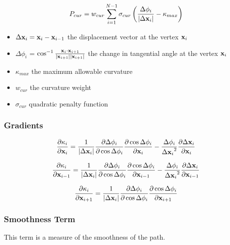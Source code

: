 \begin{equation}
P_{cur} = w_{cur} \displaystyle\sum_{i=1}^{N-1} \sigma_{cur}\left(\frac{\Delta\phi_i}{|\Delta\mathbf{x}_i|} - \kappa_{max}\right)
\end{equation}

\begin{itemize}
\item $\Delta\mathbf{x}_i = \mathbf{x}_i - \mathbf{x}_{i-1}$ the displacement vector at the vertex $\mathbf{x}_i$
\item $\Delta\phi_i$ = $\cos^{-1}\frac{\mathbf{x}_{i}\cdot\mathbf{x}_{i+1}}{|\mathbf{x}_{i+1}||\mathbf{x}_{i+1}| }$ the change in tangential angle at the vertex $\mathbf{x}_i$
\item $\kappa_{max}$ the maximum allowable curvature
\item $w_{cur}$ the curvature weight
\item $\sigma_{cur}$ quadratic penalty function
\end{itemize}

\subsubsection{Gradients}

\begin{equation}
\frac{\partial \kappa_i}{\partial \mathbf{x}_i} = \frac{1}{|\Delta\mathbf{x}_i|}\frac{\partial\Delta\phi_i}{\partial\cos\Delta\phi_i}\frac{\partial\cos\Delta\phi_i}{\partial\mathbf{x}_i}-\frac{\Delta\phi_i}{{\Delta\mathbf{x}_i}^2}\frac{\partial\Delta\mathbf{x}_i}{\partial\mathbf{x}_i}
\end{equation}

\begin{equation}
\frac{\partial \kappa_i}{\partial \mathbf{x}_{i-1}} = \frac{1}{|\Delta\mathbf{x}_i|}\frac{\partial\Delta\phi_i}{\partial\cos\Delta\phi_i}\frac{\partial\cos\Delta\phi_i}{\partial\mathbf{x}_{i-1}}-\frac{\Delta\phi_i}{{\Delta\mathbf{x}_i}^2}\frac{\partial\Delta\mathbf{x}_i}{\partial\mathbf{x}_{i-1}}
\end{equation}

\begin{equation}
\frac{\partial \kappa_i}{\partial \mathbf{x}_{i+1}} = \frac{1}{|\Delta\mathbf{x}_i|}\frac{\partial\Delta\phi_i}{\partial\cos\Delta\phi_i}\frac{\partial\cos\Delta\phi_i}{\partial\mathbf{x}_{i+1}}
\end{equation}

\subsubsection{Smoothness Term}
This term is a measure of the smoothness of the path.

